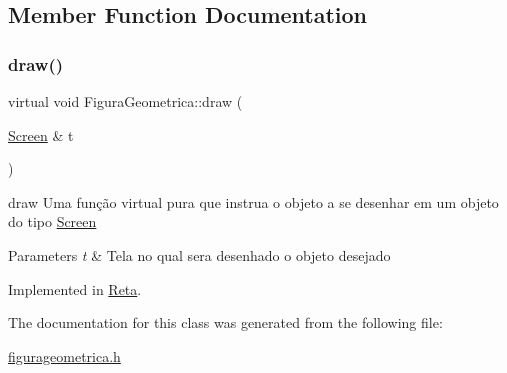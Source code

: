 \subsection{Member Function Documentation}
\mbox{\label{class_figura_geometrica_a8ee8dedc060b6059a805ea091aef2c41}} 
\subsubsection{\texorpdfstring{draw()}{draw()}}
{\footnotesize\ttfamily virtual void Figura\+Geometrica\+::draw (\begin{DoxyParamCaption}\item[{\mbox{\hyperlink{class_screen}{Screen}} \&}]{t }\end{DoxyParamCaption})\hspace{0.3cm}{\ttfamily [pure virtual]}}



draw Uma função virtual pura que instrua o objeto a se desenhar em um objeto do tipo \mbox{\hyperlink{class_screen}{Screen}} 


\begin{DoxyParams}{Parameters}
{\em t} & Tela no qual sera desenhado o objeto desejado \\
\hline
\end{DoxyParams}


Implemented in \mbox{\hyperlink{class_reta_ac2e9805183cd474b62bffd8b032cd780}{Reta}}.



The documentation for this class was generated from the following file\+:\begin{DoxyCompactItemize}
\item 
\mbox{\hyperlink{figurageometrica_8h}{figurageometrica.\+h}}\end{DoxyCompactItemize}
